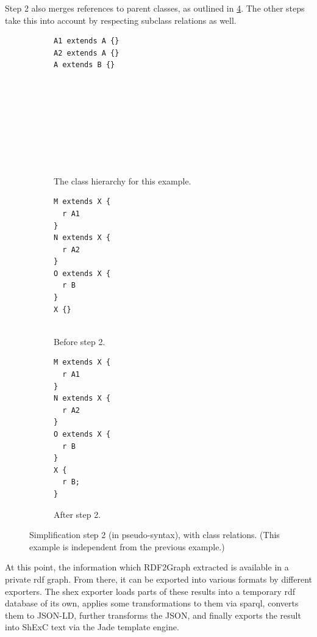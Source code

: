Step 2 also merges references to parent classes,
as outlined in \cref{fig:simplify-7.4.2-classes}.
The other steps take this into account by respecting subclass relations as well.

\begin{figure}[ht]
  \begin{subfigure}[t]{0.3\textwidth}
    \begin{lstlisting}[showlines=true]
A1 extends A {}
A2 extends A {}
A extends B {}









    \end{lstlisting}
    \caption{The class hierarchy for this example.}
    \label{fig:simplify-7.4.2-classes-hierarchy}
  \end{subfigure}
  \begin{subfigure}[t]{0.3\textwidth}
    \begin{lstlisting}[showlines=true]
M extends X {
  r A1
}
N extends X {
  r A2
}
O extends X {
  r B
}
X {}


    \end{lstlisting}
    \caption{Before step 2.}
    \label{fig:simplify-7.4.2-classes-before}
  \end{subfigure}
  \begin{subfigure}[t]{0.3\textwidth}
    \begin{lstlisting}
M extends X {
  r A1
}
N extends X {
  r A2
}
O extends X {
  r B
}
X {
  r B;
}
    \end{lstlisting}
    \caption{After step 2.}
    \label{fig:simplify-7.4.2-classes-after}
  \end{subfigure}
  \caption[Simplification step 2, with class relations.]{
    Simplification step 2 (in pseudo-syntax), with class relations.
    (This example is independent from the previous example.)
  }
  \label{fig:simplify-7.4.2-classes}
\end{figure}

At this point, the information which \gls{RDF2Graph} extracted is available in a private \gls{rdf} graph.
From there, it can be exported into various formats by different exporters.
The \gls{shex} exporter loads parts of these results into a temporary \gls{rdf} database of its own,
applies some transformations to them via \gls{sparql},
converts them to JSON-LD,
further transforms the JSON,
and finally exports the result into ShExC text via the Jade template engine.

